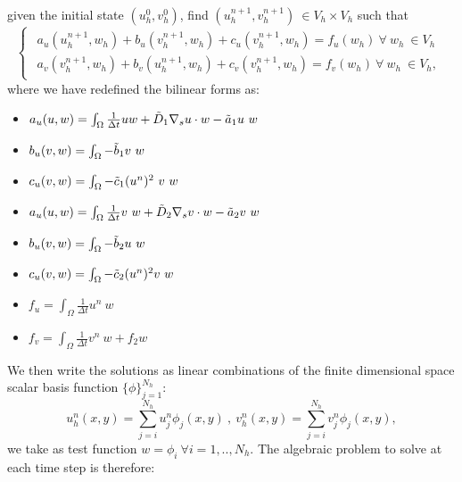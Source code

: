 given the initial state $(u_h^0, v_h^0)$, find $(u_h^{n+1}, v_h^{n+1}) \ \in V_h \times V_h$ such that
\begin{equation}\label{eq:GalerkinT}
\left\lbrace
\begin{matrix}
\begin{aligned}
  a_u(u_h^{n+1}, w_h) + b_u(v_h^{n+1}, w_h) + c_{u}(v_h^{n+1}, w_h) = f_u(w_h) \ \forall \ w_h \ \in V_h \\
  a_v(v_h^{n+1}, w_h) + b_v(u_h^{n+1}, w_h) + c_{v}(v_h^{n+1}, w_h) = f_v(w_h) \ \forall \ w_h \ \in V_h,
\end{aligned}
\end{matrix}
\right.
\end{equation}
where we have redefined the bilinear forms as:
\begin{itemize}
    \item $a_u(u, w) = \int_{\Omega} \frac{1}{\Delta t} u w + \Tilde{D}_1 \nabla_s u \cdot w - \Tilde{a}_1 u \ w $
    \item $b_u(v, w) = \int_{\Omega} - \Tilde{b}_1 v \ w$
    \item $ c_{u}(v, w) = \int_{\Omega} - \Tilde{c}_1 (u^n)^2 \ v \ w$
    \item $a_u(u, w) = \int_{\Omega} \frac{1}{\Delta t} v \ w + \Tilde{D}_2 \nabla_s v \cdot w - \Tilde{a}_2 v \ w $
    \item $b_u(v, w) = \int_{\Omega} - \Tilde{b}_2 u \ w$
    \item $c_{u}(v, w) = \int_{\Omega} - \Tilde{c}_2 (u^n)^2 v \ w$
    \item $f_u = \int_{\Omega} \frac{1}{\Delta t} u^n \ w$
    \item $f_v = \int_{\Omega} \frac{1}{\Delta t} v^n \ w + f_2 w$
\end{itemize}

We then write the solutions as linear combinations of the finite dimensional space scalar basis function $\{ \phi \}_{j=1}^{N_h}$:
\begin{equation}
        u_h^n(x,y) = \sum_{j=i}^{N_h} u_j^n \phi_j(x,y) \ , \ v_h^n(x,y) = \sum_{j=i}^{N_h} v_j^n \phi_j(x,y),
\end{equation}
we take as test function $w = \phi_i \ \forall i = 1,.., N_h$. The algebraic problem to solve at each time step is therefore:


